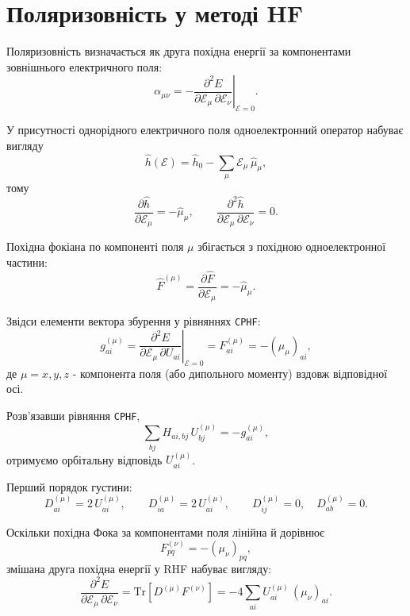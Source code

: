 \section{Поляризовність у методі HF}

Поляризовність визначається як друга похідна енергії за компонентами
зовнішнього електричного поля:
\begin{equation}\label{eq:alpha_def}
	\alpha_{\mu\nu}
	=
	-\left.\frac{\partial^2 E}{\partial \mathcal E_\mu\,\partial \mathcal E_\nu}\right|_{\mathcal E = 0}.
\end{equation}

У присутності однорідного електричного поля одноелектронний оператор
набуває вигляду
\[
	\hat h(\boldsymbol{\mathcal E})
	=
	\hat h_0 - \sum_{\mu} \mathcal E_\mu\,\hat\mu_\mu,
\]
тому
\[
	\frac{\partial \hat h}{\partial \mathcal E_\mu} = -\hat\mu_\mu,
	\qquad
	\frac{\partial^2 \hat h}{\partial \mathcal E_\mu\,\partial \mathcal E_\nu}=0.
\]


Похідна фокіана по компоненті поля \(\mu\) збігається з похідною одноелектронної частини:
\[
	\hat F^{(\mu)} = \frac{\partial \hat F}{\partial \mathcal E_\mu}
	= -\hat\mu_\mu.
\]

Звідси елементи вектора збурення у рівняннях \texttt{CPHF}:
\begin{equation}\label{eq:HF_g_vector_field}
	g^{(\mu)}_{ai}
	=
	\left.\frac{\partial^2 E}{\partial \mathcal E_\mu\,\partial U_{ai}}\right|_{\mathcal E=0}
	=
	F^{(\mu)}_{ai}
	=
	-(\mu_{\mu})_{ai},
\end{equation}
де \(\mu = x,y,z\) - компонента поля (або дипольного моменту) вздовж відповідної осі.

Розв’язавши рівняння \texttt{CPHF},
\[
	\sum_{bj} H_{ai,bj}\,U^{(\mu)}_{bj} = -g^{(\mu)}_{ai},
\]
отримуємо орбітальну відповідь \(U^{(\mu)}_{ai}\).


Перший порядок густини:
\[
	D^{(\mu)}_{ai} = 2\,U^{(\mu)}_{ai},
	\qquad
	D^{(\mu)}_{ia} = 2\,U^{(\mu)}_{ai},
	\qquad
	D^{(\mu)}_{ij}=0,\quad
	D^{(\mu)}_{ab}=0.
\]

Оскільки похідна Фока за компонентами поля лінійна й дорівнює
\[
	F^{(\nu)}_{pq} = -(\mu_{\nu})_{pq},
\]
змішана друга похідна енергії у RHF набуває вигляду:
\begin{equation}\label{eq:HF_mixed_second_derivative}
	\frac{\partial^2 E}{\partial \mathcal E_\mu\,\partial \mathcal E_\nu}
	=
	\mathrm{Tr}\!\left[D^{(\mu)} F^{(\nu)}\right]
	=
	-4 \sum_{ai}
	U^{(\mu)}_{ai}\,(\mu_{\nu})_{ai}.
\end{equation}

